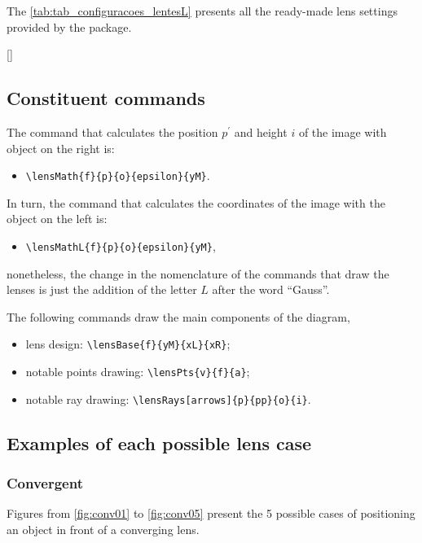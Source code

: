 \documentclass[a4paper,10pt]{article}
\begin{document}
The \autoref{tab:tab_configuracoes_lentesL} presents all the ready-made lens settings provided by the package.

\begin{table}[ht]
  \centering
  [\linewidth]{
    
  }
\end{table}

\subsection{Constituent commands}

The command that calculates the position $p^{\prime}$ and height $i$ of the image with object on the right is:
\begin{itemize}
  \item \verb|\lensMath{f}{p}{o}{epsilon}{yM}|.
\end{itemize}

In turn, the command that calculates the coordinates of the image with the object on the left is:
\begin{itemize}
  \item \verb|\lensMathL{f}{p}{o}{epsilon}{yM}|,
\end{itemize}
nonetheless, the change in the nomenclature of the commands that draw the lenses is just the addition of the letter $L$ after the word \enquote{Gauss}.

The following commands draw the main components of the diagram,
\begin{itemize}
   \item lens design: \verb|\lensBase{f}{yM}{xL}{xR}|;
   \item notable points drawing: \verb|\lensPts{v}{f}{a}|;
   \item notable ray drawing: \verb|\lensRays[arrows]{p}{pp}{o}{i}|.
\end{itemize}

\subsection{Examples of each possible lens case}

\subsubsection{Convergent}

Figures from \ref{fig:conv01} to \ref{fig:conv05} present the 5 possible cases of positioning an object in front of a converging lens.
\end{document}
